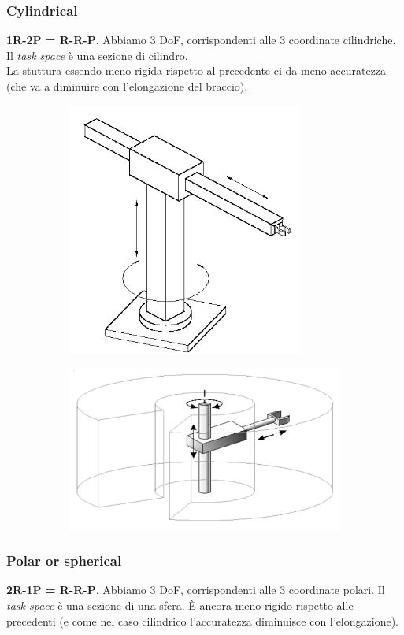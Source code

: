 \subsubsection{Cylindrical}	
\textbf{1R-2P = R-R-P}. Abbiamo 3 DoF, corrispondenti alle 3 coordinate cilindriche. Il \textit{task space} è una sezione di cilindro.\\
La stuttura essendo meno rigida rispetto al precedente ci da meno accuratezza (che va a diminuire con l'elongazione del braccio).

\begin{figure}[H]
	\begin{subfigure}{0.5\linewidth}
		\centering
		\includegraphics[width=0.4\linewidth]{images/kinematic_chains_7}
		\label{fig:kinematicchains7}
	\end{subfigure}
	\begin{subfigure}{0.5\linewidth}
		\centering
		\includegraphics[width=0.65\linewidth]{images/kinematic_chains_16}
		\label{fig:kinematicchains16}
	\end{subfigure}
\end{figure}
	
\subsubsection{Polar or spherical}
\textbf{2R-1P = R-R-P}. Abbiamo 3 DoF, corrispondenti alle 3 coordinate polari. Il \textit{task space} è una sezione di una sfera. È ancora meno rigido rispetto alle precedenti (e come nel caso cilindrico l'accuratezza diminuisce con l'elongazione).
	
